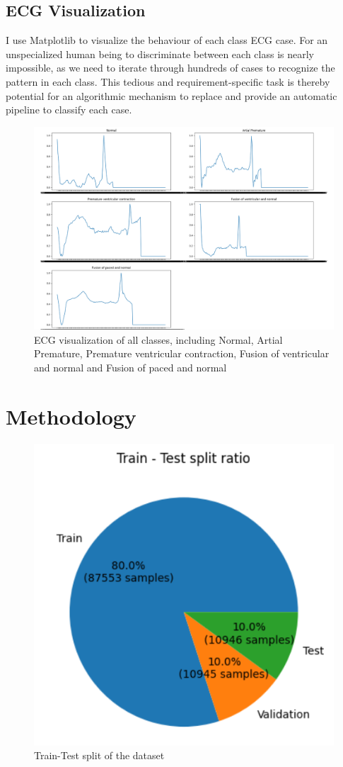 \documentclass[a4paper,12pt]{article}
\begin{document}
\subsection{ECG Visualization}
I use Matplotlib to visualize the behaviour of each class ECG case. For an unspecialized human being to discriminate between each class is nearly impossible, as we need to iterate through hundreds of cases to recognize the pattern in each class. This tedious and requirement-specific task \cite{9397163} is thereby potential for an algorithmic mechanism to replace and provide an automatic pipeline to classify each case. 
\begin{figure}[h!]
    \centering
    \includegraphics[width=0.5\linewidth]{ecg_visual.png}
    \caption{ECG visualization of all classes, including Normal, Artial Premature, Premature ventricular contraction, Fusion of ventricular and normal and Fusion of paced and normal}
    \label{fig:fig2}
\end{figure}




\section{Methodology}
\begin{figure}[h!]
    \centering
    \includegraphics[width=0.5\linewidth]{train_split.png}
    \caption{Train-Test split of the dataset}
    \label{fig:fig3}
\end{figure}
\end{document}
